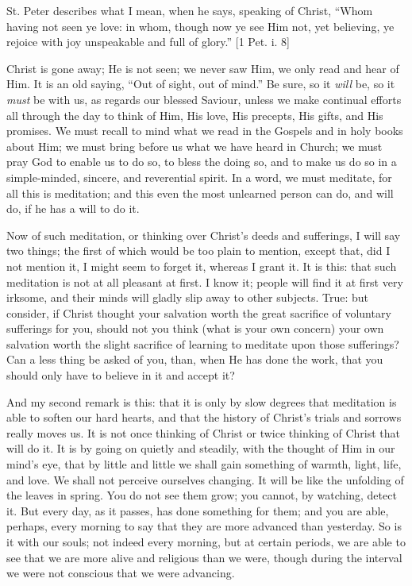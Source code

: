 St. Peter describes what I mean, when he says, speaking of Christ,
``Whom having not seen ye love: in whom, though now ye see Him not,
yet believing, ye rejoice with joy unspeakable and full of glory.''
[1 Pet. i. 8]

Christ is gone away; He is not seen; we never saw Him, we only read
and hear of Him. It is an old saying, ``Out of sight, out of
mind.'' Be sure, so it \emph{will} be, so it \emph{must} be with us,
as regards our blessed Saviour, unless we make continual efforts all
through the day to think of Him, His love, His precepts, His gifts, and
His promises. We must recall to mind what we read in the Gospels and in
holy books about Him; we must bring before us what we have heard in
Church; we must pray God to enable us to do so, to bless the doing so,
and to make us do so in a simple-minded, sincere, and reverential
spirit. In a word, we must meditate, for all this is meditation; and
this even the most unlearned person can do, and will do, if he has a
will to do it.

Now of such meditation, or thinking over Christ's deeds and
sufferings, I will say two things; the first of which would be too plain
to mention, except that, did I not mention it, I might seem to forget
it, whereas I grant it. It is this: that such meditation is not at all
pleasant at first. I know it; people will find it at first very irksome,
and their minds will gladly slip away to other subjects. True: but
consider, if Christ thought your salvation worth the great sacrifice of
voluntary sufferings for you, should not you think (what is your own
concern) your own salvation worth the slight sacrifice of learning to
meditate upon those sufferings? Can a less thing be asked of you, than,
when He has done the work, that you should only have to believe in it
and accept it?

And my second remark is this: that it is only by slow degrees that
meditation is able to soften our hard hearts, and that the history of
Christ's trials and sorrows really moves us. It is not once thinking of
Christ or twice thinking of Christ that will do it. It is by going on
quietly and steadily, with the thought of Him in our mind's eye, that by
little and little we shall gain something of warmth, light, life, and
love. We shall not perceive ourselves changing. It will be like the
unfolding of the leaves in spring. You do not see them grow; you cannot,
by watching, detect it. But every day, as it passes, has done something
for them; and you are able, perhaps, every morning to say that they are
more advanced than yesterday. So is it with our souls; not indeed every
morning, but at certain periods, we are able to see that we are more
alive and religious than we were, though during the interval we were not
conscious that we were advancing.


